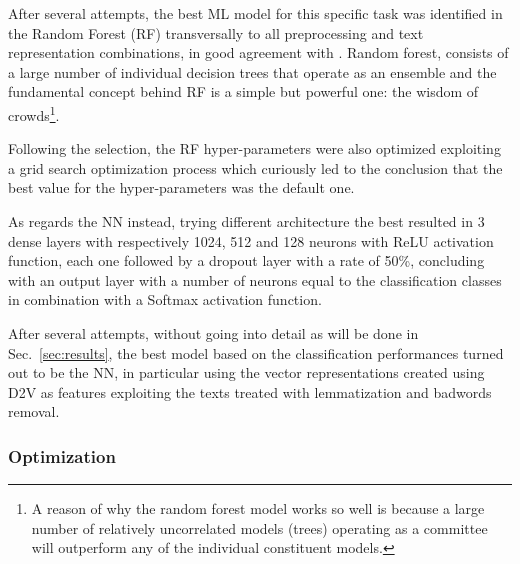 \documentclass[10pt]{article}
\begin{document}
After several attempts, the best ML model for this specific task was identified in the Random Forest (RF) transversally to all preprocessing and text representation combinations, in good agreement with \cite{RF}. 
Random forest, consists of a large number of individual decision trees that operate as an ensemble and the fundamental concept behind RF is a simple but powerful one: the wisdom of crowds\footnote{A reason of why the random forest model works so well is because a large number of relatively uncorrelated models (trees) operating as a committee will outperform any of the individual constituent models.}. 

Following the selection, the RF hyper-parameters were also optimized exploiting a grid search optimization process which curiously led to the conclusion that the best value for the hyper-parameters was the default one.

As regards the NN instead, trying different architecture the best resulted in 3 dense layers with respectively 1024, 512 and 128 neurons with ReLU activation function, each one followed by a dropout layer with a rate of 50\%, concluding with an output layer with a number of neurons equal to the classification classes in combination with a Softmax activation function.

After several attempts, without going into detail as will be done in Sec.~\ref{sec:results}, the best model based on the classification performances turned out to be the NN, in particular using the vector representations created using D2V as features exploiting the texts treated with lemmatization and badwords removal.







\subsubsection{Optimization \label{subsubsec: optimization}}
\end{document}
